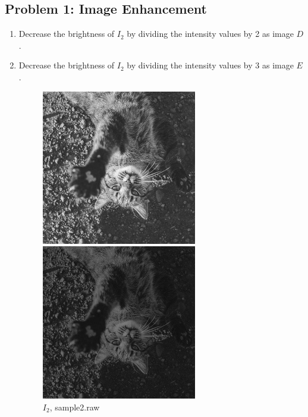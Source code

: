 \documentclass[12pt,a4paper,notitlepage,oneside,amsmath,amssymb]{article}
\begin{document}
\begin{CJK*}{UTF8}{bkai}
  \section*{Problem 1: Image Enhancement}
  \begin{enumerate}[label=(\alph*)]
    \item Decrease the brightness of \(I_2\) by dividing the intensity values by 2 as image \(D\).
    \item Decrease the brightness of \(I_2\) by dividing the intensity values by 3 as image \(E\).

          \begin{figure}[hbt!]
            \centering
            \begin{minipage}{.33\textwidth}
              \centering
              \includegraphics[width=.8\linewidth]{sample2}
              \caption{\(I_2\), sample2.raw}
            \end{minipage}%
            \begin{minipage}{.33\textwidth}
              \centering
              \includegraphics[width=.8\linewidth]{imageD}

\end{minipage}
\end{figure}
\end{enumerate}
\end{CJK*}
\end{document}
